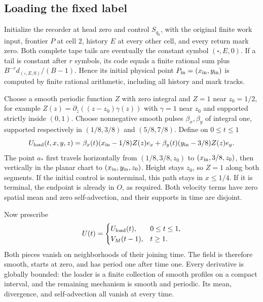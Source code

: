 \documentclass[11pt]{article}
\theoremstyle{remark}
\begin{document}
\subsection{Loading the fixed label}
Initialize the recorder at head zero and control $S_{q_0}$, with the original
finite work input, frontier $P$ at cell $2$, history $E$ at every other
cell, and every return mark zero. Both complete tape tails are eventually
the constant symbol $(\square,E,0)$. If a tail is constant after $r$ symbols,
its code equals a finite rational sum plus
$B^{-r}d_{(\square,E,0)}/(B-1)$. Hence its initial physical point
$P_{\rm in}=(x_{\rm in},y_{\rm in})$ is computed by finite rational
arithmetic, including all history and mark tracks.

Choose a smooth periodic function $Z$ with zero integral and $Z=1$ near
$z_0=1/2$, for example
$Z(z)=\partial_z((z-z_0)\gamma(z))$ with $\gamma=1$ near $z_0$ and
supported strictly inside $(0,1)$. Choose nonnegative smooth pulses
$\beta_x,\beta_y$ of integral one, supported respectively in
$(1/8,3/8)$ and $(5/8,7/8)$. Define on $0\le t\le1$
\begin{equation}\label{eq:b-loader}
 U_{\rm load}(t,x,y,z)=
 \beta_x(t)(x_{\rm in}-1/8)Z(z)e_x+
 \beta_y(t)(y_{\rm in}-3/8)Z(z)e_y.
\end{equation}
The point $a_*$ first travels horizontally from $(1/8,3/8,z_0)$ to
$(x_{\rm in},3/8,z_0)$, then vertically in the planar chart to
$(x_{\rm in},y_{\rm in},z_0)$. Height stays $z_0$, so $Z=1$ along both
segments. If the initial control is nonterminal, this path stays in
$x\le1/4$. If it is terminal, the endpoint is already in $O$, as required.
Both velocity terms have zero spatial mean and zero self-advection, and their
supports in time are disjoint.

Now prescribe
\begin{equation}\label{eq:b-U}
 U(t)=\begin{cases}U_{\rm load}(t),&0\le t\le1,\\
                    V_M(t-1),&t\ge1.
       \end{cases}
\end{equation}
Both pieces vanish on neighborhoods of their joining time. The field is
therefore smooth, starts at zero, and has period one after time one.
Every derivative is globally bounded: the loader is a finite collection
of smooth profiles on a compact interval, and the remaining mechanism
is smooth and periodic. Its mean, divergence, and self-advection all
vanish at every time.
\end{document}
